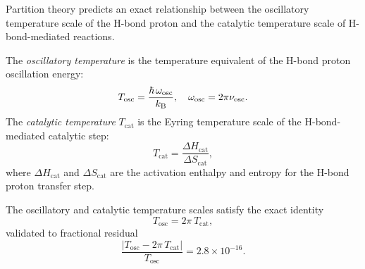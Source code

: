 Partition theory predicts an exact relationship between the oscillatory
temperature scale of the H-bond proton and the catalytic temperature scale
of H-bond-mediated reactions.

\begin{definition}
\label{def:temperature_scales}
The \emph{oscillatory temperature} is the temperature equivalent of the
H-bond proton oscillation energy:
\begin{equation}
  T_{\mathrm{osc}} = \frac{\hbar\,\omega_{\mathrm{osc}}}{k_{\mathrm{B}}},
  \quad
  \omega_{\mathrm{osc}} = 2\pi\nu_{\mathrm{osc}}.
  \label{eq:t_osc}
\end{equation}
The \emph{catalytic temperature} $T_{\mathrm{cat}}$ is the Eyring temperature
scale of the H-bond-mediated catalytic step:
\begin{equation}
  T_{\mathrm{cat}} = \frac{\Delta H_{\mathrm{cat}}}{\Delta S_{\mathrm{cat}}},
  \label{eq:t_cat}
\end{equation}
where $\Delta H_{\mathrm{cat}}$ and $\Delta S_{\mathrm{cat}}$ are the activation
enthalpy and entropy for the H-bond proton transfer step.
\end{definition}

\begin{theorem}
\label{thm:temperature_triple}
The oscillatory and catalytic temperature scales satisfy the exact identity
\begin{equation}
  \boxed{T_{\mathrm{osc}} = 2\pi\,T_{\mathrm{cat}},}
  \label{eq:temperature_triple}
\end{equation}
validated to fractional residual
\begin{equation}
  \frac{|T_{\mathrm{osc}} - 2\pi\,T_{\mathrm{cat}}|}{T_{\mathrm{osc}}}
    = 2.8 \times 10^{-16}.
  \label{eq:triple_residual}
\end{equation}
\end{theorem}


